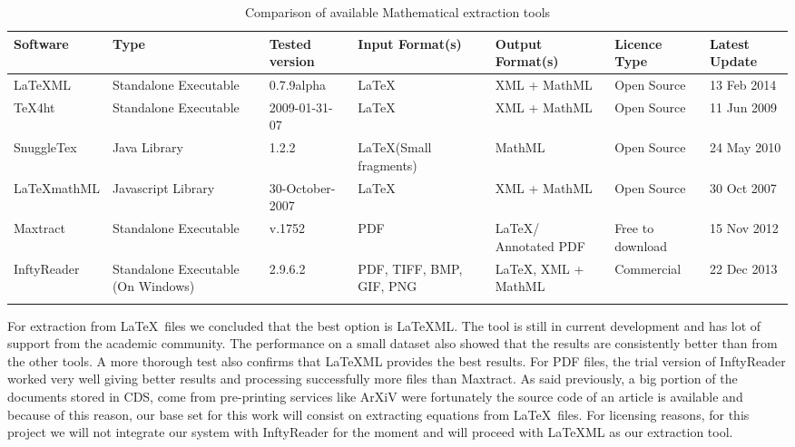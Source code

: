 \begin{longtable}{|>{\centering\arraybackslash}
m{2.93cm}|>{\centering\arraybackslash}
m{1.8cm}|>{\centering\arraybackslash}
m{1.6cm}|>{\centering\arraybackslash}
m{1.9cm}|>{\centering\arraybackslash}
m{1.6cm}|>{\centering\arraybackslash}
m{1.8cm}|>{\centering\arraybackslash}
m{1.4cm}|
}
\hline 
\small{\textbf{Software}} & \small{\textbf{Type}} & \small{\textbf{Tested version}} & \small{\textbf{Input Format(s)}} & \small{\textbf{Output Format(s)}} & \small{\textbf{Licence Type}} & \small{\textbf{Latest Update}}  \\
\hline
\small{LaTeXML}\cite{latexml} & \small{Standalone Executable} & \small{0.7.9alpha} & \small{\LaTeX} & \small{XML + MathML} & \small{Open Source} & \small{13 Feb 2014}  \\
\hline
\small{TeX4ht}\cite{tex4ht2} & \small{Standalone Executable} & \small{ 2009-01-31-07} & \small{\LaTeX} & \small{XML + MathML} & \small{ Open Source} & \small{11 Jun 2009}  \\
\hline
\small{SnuggleTex}\cite{snuggletex} & \small{Java Library} & \small{1.2.2} & \small{\LaTeX (Small fragments)} & \small{MathML} & \small{Open Source} & \small{24 May 2010}  \\
\hline
\small{LaTeXmathML}\cite{latexmathml} & \small{Javascript Library} & \small{30-October-2007} & \small{\LaTeX} & \small{XML + MathML} & \small{Open Source} & \small{30 Oct 2007}  \\
\hline
\small{Maxtract}\cite{maxtract1}\cite{maxtract2} & \small{Standalone Executable} & \small{v.1752} & \small{PDF} & \small{\LaTeX / Annotated PDF} & \small{Free to download} & \small{15 Nov 2012}  \\
\hline
\small{InftyReader}\cite{infty1}\cite{infty2} & \small{Standalone Executable (On Windows)} & \small{2.9.6.2} & \small{PDF, TIFF, BMP, GIF, PNG} & \small{\LaTeX, XML + MathML} & \small{Commercial} & \small{22 Dec 2013}  \\

\hline
\caption{Comparison of available Mathematical extraction tools}
\label{math_extraction_tools}
\end{longtable}

For extraction from \LaTeX\  files we concluded that the best option is LaTeXML. The tool is still in current development and has lot of support from the academic community. The performance on a small dataset also showed that the results are consistently better than from the other tools. A more thorough test\cite{latexcomparison} also confirms that LaTeXML provides the best results. For PDF files, the trial version of InftyReader worked very well giving better results and processing successfully more files than Maxtract. As said previously, a big portion of the documents stored in CDS, come from pre-printing services like ArXiV were fortunately the source code of an article is available and because of this reason, our base set for this work will consist on extracting equations from \LaTeX\  files. For licensing reasons, for this project we will not integrate our system with InftyReader for the moment and will proceed with LaTeXML as our extraction tool.



